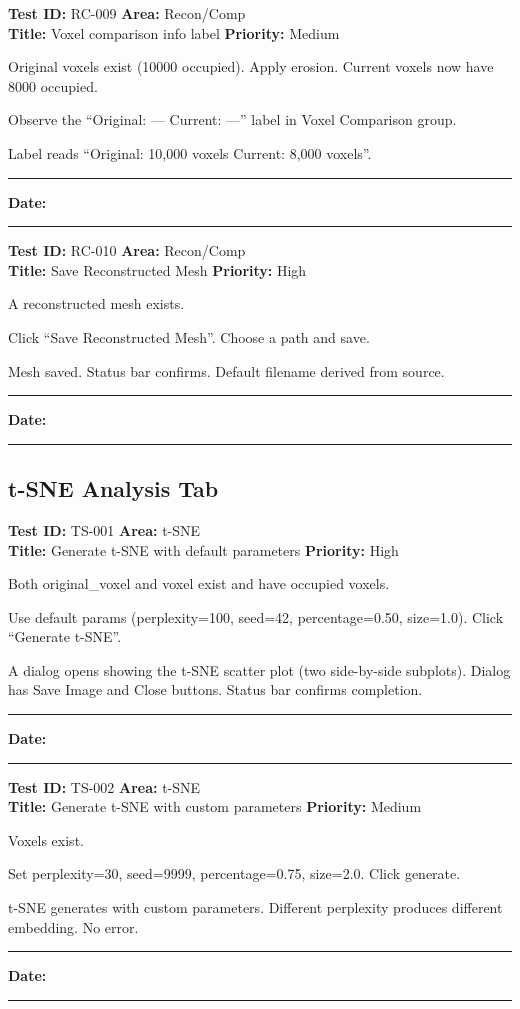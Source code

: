 \documentclass[12pt,a4paper]{article}
\newenvironment{testcase}[4]{%
  \smallskip
  \noindent\textbf{Test ID:} #1 \hfill \textbf{Area:} #2 \\
  \textbf{Title:} #3 \hfill \textbf{Priority:} #4
  \begin{description}[leftmargin=2em,style=nextline]
    \item[\textbf{Preconditions:}]
}{%
    \item[\textbf{Steps:}]
    \item[\textbf{Expected Result:}]
    \item[\textbf{Status:}] \rule{3cm}{0.4pt} \hspace{1em} \textbf{Date:} \rule{3cm}{0.4pt}
    \item[\textbf{Notes:}]
  \end{description}
  \smallskip
}
\begin{document}
\begin{testcase}{RC-009}{Recon/Comp}{Voxel comparison info label}{Medium}
  \item Original voxels exist (10000 occupied). Apply erosion. Current voxels now have 8000 occupied.
  \item Observe the ``Original: --- Current: ---'' label in Voxel Comparison group.
  \item Label reads ``Original: 10,000 voxels   Current: 8,000 voxels''.
\end{testcase}

\begin{testcase}{RC-010}{Recon/Comp}{Save Reconstructed Mesh}{High}
  \item A reconstructed mesh exists.
  \item Click ``Save Reconstructed Mesh''. Choose a path and save.
  \item Mesh saved. Status bar confirms. Default filename derived from source.
\end{testcase}

\subsection{t-SNE Analysis Tab}

\begin{testcase}{TS-001}{t-SNE}{Generate t-SNE with default parameters}{High}
  \item Both original\_voxel and voxel exist and have occupied voxels.
  \item Use default params (perplexity=100, seed=42, percentage=0.50, size=1.0). Click ``Generate t-SNE''.
  \item A dialog opens showing the t-SNE scatter plot (two side-by-side subplots). Dialog has Save Image and Close buttons. Status bar confirms completion.
\end{testcase}

\begin{testcase}{TS-002}{t-SNE}{Generate t-SNE with custom parameters}{Medium}
  \item Voxels exist.
  \item Set perplexity=30, seed=9999, percentage=0.75, size=2.0. Click generate.
  \item t-SNE generates with custom parameters. Different perplexity produces different embedding. No error.
\end{testcase}
\end{document}
